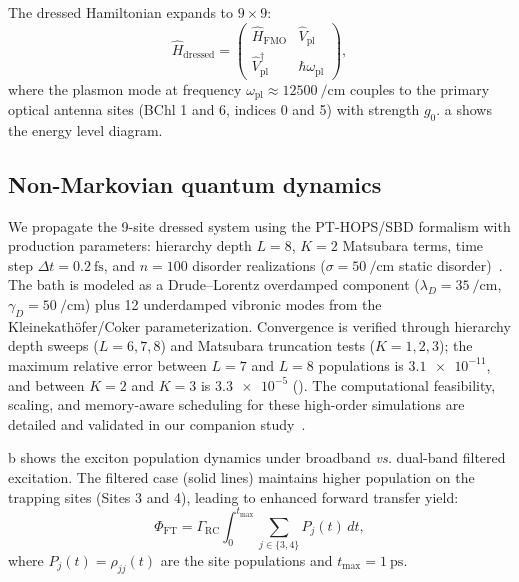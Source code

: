 \documentclass[preprint,12pt]{elsarticle}
\begin{document}
The dressed Hamiltonian expands to $9\times 9$:
\begin{equation}
\hat{H}_{\mathrm{dressed}} = 
\begin{pmatrix}
\hat{H}_{\mathrm{FMO}} & \hat{V}_{\mathrm{pl}} \\
\hat{V}_{\mathrm{pl}}^{\dagger} & \hbar\omega_{\mathrm{pl}}
\end{pmatrix},
\label{eq:dressed_hamiltonian}
\end{equation}
where the plasmon mode at frequency $\omega_{\mathrm{pl}} \approx \qty{12500}{\per\cm}$ couples to the primary optical antenna sites (BChl 1 and 6, indices 0 and 5) with strength $g_0$.
a shows the energy level diagram.

\subsection*{Non-Markovian quantum dynamics}

We propagate the 9-site dressed system using the PT-HOPS/SBD formalism with production parameters: hierarchy depth $L=8$, $K=2$ Matsubara terms, time step $\Delta t = \qty{0.2}{\fs}$, and $n=100$ disorder realizations ($\sigma = \qty{50}{\per\cm}$ static disorder)~\cite{Varvelo2021,Citty2024}.
The bath is modeled as a Drude--Lorentz overdamped component ($\lambda_D = \qty{35}{\per\cm}$, $\gamma_D = \qty{50}{\per\cm}$) plus 12 underdamped vibronic modes from the Kleinekath\"{o}fer/Coker parameterization.
Convergence is verified through hierarchy depth sweeps ($L=6,7,8$) and Matsubara truncation tests ($K=1,2,3$); the maximum relative error between $L=7$ and $L=8$ populations is $\num{3.1e-11}$, and between $K=2$ and $K=3$ is $\num{3.3e-5}$ (). The computational feasibility, scaling, and memory-aware scheduling for these high-order simulations are detailed and validated in our companion study~\cite{Kouam2026}.

b shows the exciton population dynamics under broadband \emph{vs.} dual-band filtered excitation.
The filtered case (solid lines) maintains higher population on the trapping sites (Sites 3 and 4), leading to enhanced forward transfer yield:
\begin{equation}
\Phi_{\mathrm{FT}} = \Gamma_{\mathrm{RC}} \int_0^{t_{\mathrm{max}}} \sum_{j \in \{3,4\}} P_j(t)\,dt,
\label{eq:phi_ft}
\end{equation}
where $P_j(t) = \rho_{jj}(t)$ are the site populations and $t_{\mathrm{max}} = \qty{1}{\ps}$.
\end{document}
